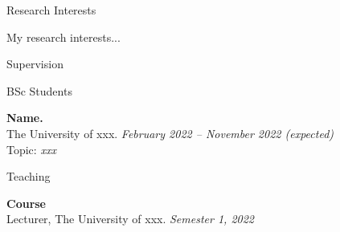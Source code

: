 \documentclass{resume} %
\begin{document}
\begin{rSection}{Research Interests}

My research interests... 

\end{rSection}



\begin{rSection}{Supervision}
	\begin{rSubsection}{BSc Students}{}{}{}
		\item {\bf Name.}\\ The University of xxx. \hfill {\em February 2022 -- November 2022 (expected)} \\Topic: {\em xxx}
	\end{rSubsection}
\end{rSection}

\begin{rSection}{Teaching}
	\begin{rSubsection}{}{}{}{}
		\item {\bf Course}\\ Lecturer, The University of xxx. \hfill {\em Semester 1, 2022} 
	\end{rSubsection}
\end{rSection}
\end{document}
